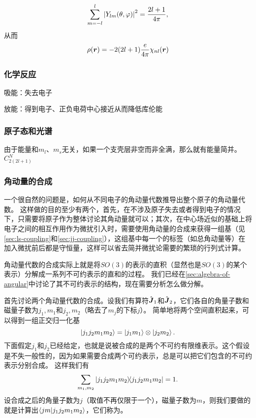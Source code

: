 \[
    \sum_{m=-l}^l \abs{Y_{lm}(\theta, \varphi)}^2 = \frac{2l+1}{4\pi},
\]
从而
\[
    \rho(\vb*{r}) = -2(2l+1) \frac{e}{4\pi} \chi_{nl}(\vb*{r})
\]

\subsubsection{化学反应}

吸能：失去电子

放能：得到电子、正负电荷中心接近从而降低库伦能

\subsubsection{原子态和光谱}

由于能量和$m_l$、$m_s$无关，如果一个支壳层非空而非全满，那么就有能量简并。$C_{2(2l+1)}^N$

\subsubsection{角动量的合成}

一个很自然的问题是，如何从不同电子的角动量代数推导出整个原子的角动量代数。
这样做的目的至少有两个，首先，在不涉及原子失去或者得到电子的情况下，只需要将原子作为整体讨论其角动量就可以；其次，在中心场近似的基础上将电子之间的相互作用作为微扰引入时，需要使用角动量的合成来获得一组基（见\autoref{sec:ls-coupling}和\autoref{sec:jj-coupling}），这组基中每一个的标签（如总角动量等）在加入微扰前后都是守恒量，这样可以省去简并微扰论需要的繁琐的行列式计算。

角动量代数的合成实际上就是将$SO(3)$的表示的直积（显然也是$SO(3)$的某个表示）分解成一系列不可约表示的直和的过程。
我们已经在\autoref{sec:algebra-of-angular}中讨论了其不可约表示的结构，现在需要分析怎么做分解。

首先讨论两个角动量代数的合成。设我们有算符$\hat{\vb*{J}}_1$和$\hat{\vb*{J}}_2$，它们各自的角量子数和磁量子数为$j_1, m_1$和$j_2, m_2$（略去了$m_j$的下标$j$）。
简单地将两个空间直积起来，可以得到一组正交归一化基
\begin{equation}
    \ket{j_1 j_2 m_1 m_2} = \ket{j_1 m_1} \otimes \ket{j_2 m_2}.
\end{equation}
下面假定$j_1$和$j_2$已经给定，也就是说被合成的是两个不可约有限维表示。这个假设是不失一般性的，因为如果需要合成两个可约表示，总是可以把它们包含的不可约表示分别合成。
这样我们有
\[
    \sum_{m_1,m_2} \dyad{j_1 j_2 m_1 m_2} = 1.
\]
设合成之后的角量子数为$j$（取值不再仅限于一个），磁量子数为$m$，则我们要做的就是计算出$\braket{jm}{j_1 j_2 m_1 m_2}$，它们称为。

